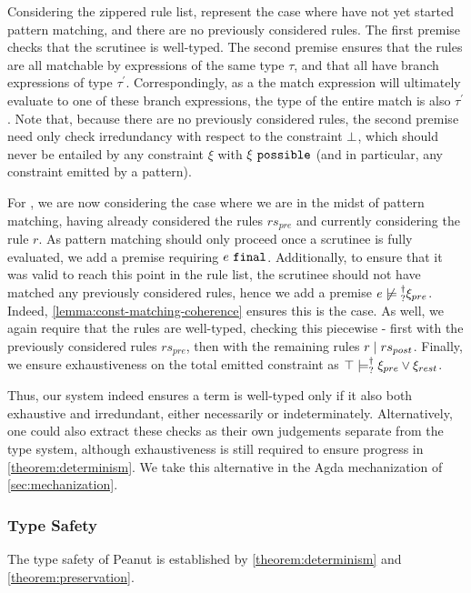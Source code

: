 Considering the zippered rule list, \TMatchZPre represent the case where have not yet started pattern matching, and there are no previously considered rules. The first premise checks that the scrutinee is well-typed. The second premise ensures that the rules are all matchable by expressions of the same type $\tau$, and that all have branch expressions of type $\tau^\prime$. Correspondingly, as a the match expression will ultimately evaluate to one of these branch expressions, the type of the entire match is also $\tau^\prime$. Note that, because there are no previously considered rules, the second premise need only check irredundancy with respect to the constraint $\bot$, which should never be entailed by any constraint $\xi$ with $\xi ~\mathtt{possible}$ (and in particular, any constraint emitted by a pattern).

For \TMatchNZPre, we are now considering the case where we are in the midst of pattern matching, having already considered the rules $rs_{pre}$ and currently considering the rule $r$. As pattern matching should only proceed once a scrutinee is fully evaluated, we add a premise requiring $e ~\mathtt{final}$. Additionally, to ensure that it was valid to reach this point in the rule list, the scrutinee should not have matched any previously considered rules, hence we add a premise $\cnotsatisfyormay{e}{\xi_{pre}}$. Indeed, \autoref{lemma:const-matching-coherence} ensures this is the case. As well, we again require that the rules are well-typed, checking this piecewise - first with the previously considered rules $rs_{pre}$, then with the remaining rules $r \mid rs_{post}$. Finally, we ensure exhaustiveness on the total emitted constraint as $\top \models_{?}^{\dag} \xi_{pre} \vee \xi_{rest}$.

Thus, our system indeed ensures a term is well-typed only if it also both exhaustive and irredundant, either necessarily or indeterminately. Alternatively, one could also extract these checks as their own judgements separate from the type system, although exhaustiveness is still required to ensure progress in \autoref{theorem:determinism}. We take this alternative in the Agda mechanization of \autoref{sec:mechanization}.

\subsubsection{Type Safety}
The type safety of Peanut is established by \autoref{theorem:determinism} and \autoref{theorem:preservation}.

